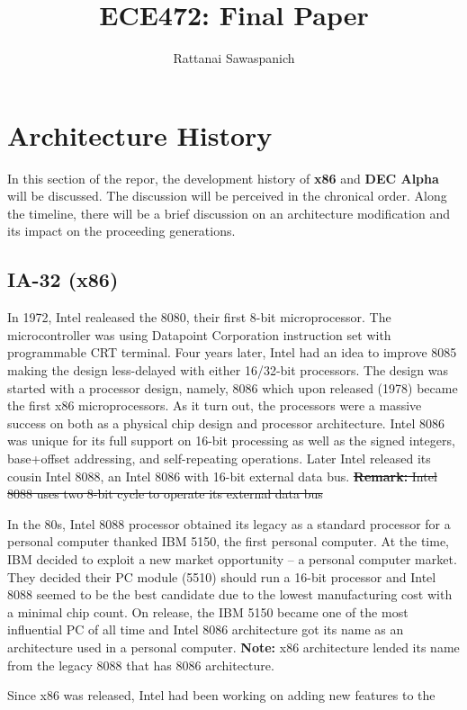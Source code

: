\documentclass[letterpaper,10pt,titlepage]{article}
\title{ECE472: Final Paper}
\author{Rattanai Sawaspanich}
\begin{document}
\maketitle

\section{Architecture History}
In this section of the repor, the development history of \textbf{x86} and
\textbf{DEC Alpha} will be discussed. The discussion will be perceived in 
the chronical order.  Along the timeline, there will be a brief discussion
on an architecture modification and its impact on the proceeding 
generations. 

\subsection{IA-32 (x86)}
In 1972, Intel realeased the 8080, their first 8-bit microprocessor.  The
microcontroller was using Datapoint Corporation instruction set with 
programmable CRT terminal. Four years later, Intel had an idea to improve
8085 making the design less-delayed with either 16/32-bit processors.
The design was started with a processor design, namely, 8086  
which upon released (1978) became the first x86 microprocessors. 
As it turn out, the processors were a massive success on both as a physical
chip design and processor architecture. Intel 8086 was unique for its full 
support on 16-bit processing as well as the signed integers, base+offset 
addressing, and self-repeating operations. Later Intel released its cousin
Intel 8088, an Intel 8086 with 16-bit external data bus. 
\sout{\textbf{Remark:} Intel 8088 uses two 8-bit cycle to operate its 
external data bus}
\par
In the 80s, Intel 8088 processor obtained its legacy as a standard processor
for a personal computer thanked IBM 5150, the first personal computer.
At the time, IBM decided to exploit a new market opportunity -- a personal 
computer market. They decided their PC module (5510) should run a 16-bit 
processor and Intel 8088 seemed to be the best candidate due to the 
lowest manufacturing cost with a minimal chip count. On release, the IBM 5150
became one of the most influential PC of all time and Intel 8086 architecture 
got its name as an architecture used in a personal computer.  
\textbf{Note:} x86 architecture lended its name from the legacy 8088 that has
8086 architecture.
\par
Since x86 was released, Intel had been working on adding new features to the
\end{document}
